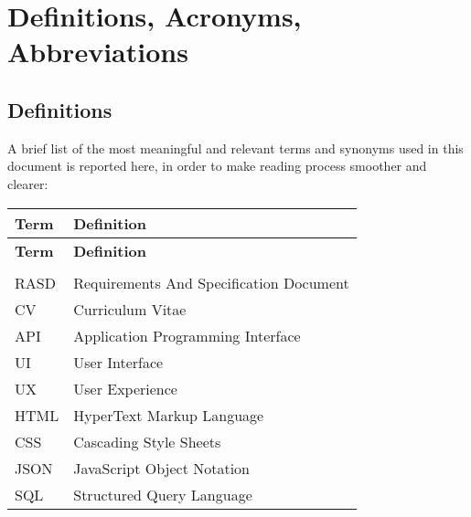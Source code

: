 \section{Definitions, Acronyms, Abbreviations}

\subsection{Definitions}

A brief list of the most meaningful and relevant terms and synonyms used in this document is reported
here, in order to make reading process smoother and clearer:


\begin{longtable}{@{} l p{} @{}}

\textbf{Term} & \textbf{Definition} \\
\endfirsthead

\textbf{Term} & \textbf{Definition} \\
\endhead

\\
RASD & Requirements And Specification Document \vspace{5mm} \\
CV & Curriculum Vitae \vspace{5mm} \\
API & Application Programming Interface \vspace{5mm} \\
UI & User Interface \vspace{5mm} \\
UX & User Experience \vspace{5mm} \\
HTML & HyperText Markup Language \vspace{5mm} \\
CSS & Cascading Style Sheets \vspace{5mm} \\
JSON & JavaScript Object Notation \vspace{5mm} \\
SQL & Structured Query Language \vspace{5mm} \\
\end{longtable}

